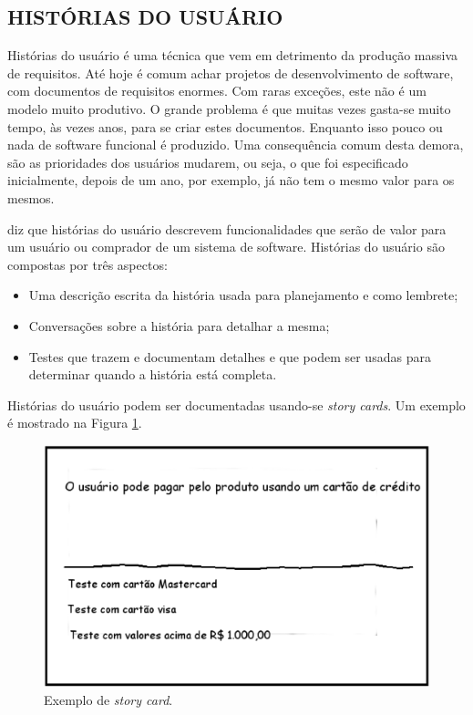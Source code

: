 \subsection{HISTÓRIAS DO USUÁRIO}

Histórias do usuário é uma técnica que vem em detrimento da produção massiva de requisitos. 
Até hoje é comum achar projetos de desenvolvimento de software, com documentos de requisitos enormes. 
Com raras exceções, este não é um modelo muito produtivo. 
O grande problema é que muitas vezes gasta-se muito tempo, às vezes anos, para se criar estes documentos. 
Enquanto isso pouco ou nada de software funcional é produzido. 
Uma consequência comum desta demora, são as prioridades dos usuários mudarem, ou seja, o que foi especificado inicialmente, depois de um ano, por exemplo, já não tem o mesmo valor para os mesmos.

\cite{cohn2004} diz que histórias do usuário descrevem funcionalidades que serão de valor para um usuário ou comprador de um sistema de software. Histórias do usuário são compostas por três aspectos: 
\begin{itemize}
	\item Uma descrição escrita da história usada para planejamento e como lembrete;
	\item Conversações sobre a história para detalhar a mesma;
	\item Testes que trazem e documentam detalhes e que podem ser usadas para determinar quando a história está completa.
\end{itemize}

Histórias do usuário podem ser documentadas usando-se \emph{story cards}. Um exemplo é mostrado na Figura \ref{story_card}.
\begin{figure}[ht]
	\centering
	\includegraphics[width=15 cm]{figuras/story_card.eps}
	\caption{Exemplo de \emph{story card}.}
    	\label{story_card}
\end{figure}

